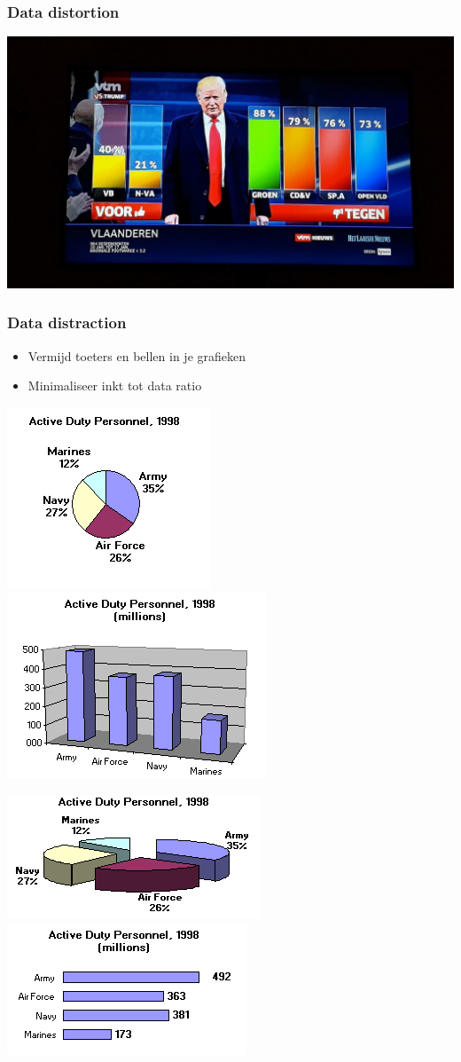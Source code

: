 \documentclass{beamer}
\begin{document}
\begin{frame}
  \frametitle{Data distortion}

  \begin{center}
    \includegraphics[width=.8\textwidth]{img/les2-03-2}
  \end{center}
\end{frame}
\begin{frame}
  \frametitle{Data distraction}

  \begin{itemize}
    \item Vermijd toeters en bellen in je grafieken
    \item Minimaliseer inkt tot data ratio
  \end{itemize}

  \centering
  \includegraphics[width=.4\textwidth]{img/les2-04}
  \includegraphics[width=.4\textwidth]{img/les2-05}

  \includegraphics[width=.4\textwidth]{img/les2-06}
  \includegraphics[width=.4\textwidth]{img/les2-07}
\end{frame}
\end{document}
